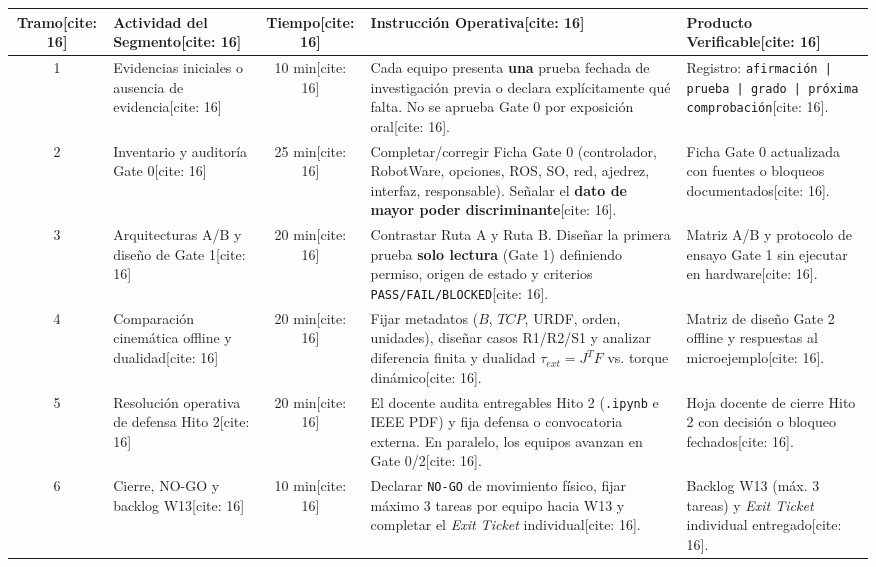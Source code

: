 \documentclass[11pt, a4paper]{article}
\begin{document}
\begin{center}
\footnotesize
\renewcommand{\arraystretch}{1.35}
\begin{tabularx}{\textwidth}{|c|>{\hsize=0.85\hsize\raggedright\arraybackslash}X|c|>{\hsize=1.35\hsize\raggedright\arraybackslash}X|>{\hsize=0.80\hsize\raggedright\arraybackslash}X|}
\hline
\rowcolor{ucbblue!15}
\textbf{Tramo}[cite: 16] & \textbf{Actividad del Segmento}[cite: 16] & \textbf{Tiempo}[cite: 16] & \textbf{Instrucción Operativa}[cite: 16] & \textbf{Producto Verificable}[cite: 16] \\ \hline
1 & Evidencias iniciales o ausencia de evidencia[cite: 16] & 10 min[cite: 16] & Cada equipo presenta \textbf{una} prueba fechada de investigación previa o declara explícitamente qué falta. No se aprueba Gate 0 por exposición oral[cite: 16]. & Registro: \texttt{afirmación | prueba | grado | próxima comprobación}[cite: 16]. \\ \hline
2 & Inventario y auditoría Gate 0[cite: 16] & 25 min[cite: 16] & Completar/corregir Ficha Gate 0 (controlador, RobotWare, opciones, ROS, SO, red, ajedrez, interfaz, responsable). Señalar el \textbf{dato de mayor poder discriminante}[cite: 16]. & Ficha Gate 0 actualizada con fuentes o bloqueos documentados[cite: 16]. \\ \hline
3 & Arquitecturas A/B y diseño de Gate 1[cite: 16] & 20 min[cite: 16] & Contrastar Ruta A y Ruta B. Diseñar la primera prueba \textbf{solo lectura} (Gate 1) definiendo permiso, origen de estado y criterios \texttt{PASS/FAIL/BLOCKED}[cite: 16]. & Matriz A/B y protocolo de ensayo Gate 1 sin ejecutar en hardware[cite: 16]. \\ \hline
4 & Comparación cinemática offline y dualidad[cite: 16] & 20 min[cite: 16] & Fijar metadatos ($B$, $TCP$, URDF, orden, unidades), diseñar casos R1/R2/S1 y analizar diferencia finita y dualidad $\tau_{ext}=J^T F$ vs. torque dinámico[cite: 16]. & Matriz de diseño Gate 2 offline y respuestas al microejemplo[cite: 16]. \\ \hline
5 & Resolución operativa de defensa Hito 2[cite: 16] & 20 min[cite: 16] & El docente audita entregables Hito 2 (\texttt{.ipynb} e IEEE PDF) y fija defensa o convocatoria externa. En paralelo, los equipos avanzan en Gate 0/2[cite: 16]. & Hoja docente de cierre Hito 2 con decisión o bloqueo fechados[cite: 16]. \\ \hline
6 & Cierre, NO-GO y backlog W13[cite: 16] & 10 min[cite: 16] & Declarar \texttt{NO-GO} de movimiento físico, fijar máximo 3 tareas por equipo hacia W13 y completar el \textit{Exit Ticket} individual[cite: 16]. & Backlog W13 (máx. 3 tareas) y \textit{Exit Ticket} individual entregado[cite: 16]. \\ \hline
\end{tabularx}
\end{center}
\end{document}
